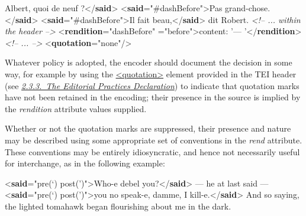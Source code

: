 \begin{shaded}
 Albert, quoi de neuf ?{</\textbf{said}>}\mbox{}\newline 
{<\textbf{said}\hspace*{1em}{rendition}="{\#dashBefore}">}Pas grand-chose.{</\textbf{said}>}\mbox{}\newline 
{<\textbf{said}\hspace*{1em}{rendition}="{\#dashBefore}">}Il fait beau,{</\textbf{said}>}\mbox{}\newline 
 dit Robert.\mbox{}\newline 
\mbox{}\newline 
\textit{<!-- ...  within the header  -->}\mbox{}\newline 
{<\textbf{rendition}\hspace*{1em}{xml:id}="{dashBefore}"\mbox{}\newline 
\hspace*{1em}{scope}="{before}">}content: '— '{</\textbf{rendition}>}\mbox{}\newline 
\textit{<!-- ... -->}\mbox{}\newline 
{<\textbf{quotation}\hspace*{1em}{marks}="{none}"/>}\end{shaded}\egroup\par \par
Whatever policy is adopted, the encoder should document the decision in some way, for example by using the \hyperref[TEI.quotation]{<quotation>} element provided in the TEI header (see \textit{\hyperref[HD53]{2.3.3.\ The Editorial Practices Declaration}}) to indicate that quotation marks have not been retained in the encoding; their presence in the source is implied by the {\itshape rendition} attribute values supplied.\par
Whether or not the quotation marks are suppressed, their presence and nature may be described using some appropriate set of conventions in the {\itshape rend} attribute. These conventions may be entirely idiosyncratic, and hence not necessarily useful for interchange, as in the following example: \par\bgroup{}\exampleFont \begin{shaded}\noindent\mbox{}{<\textbf{said}\hspace*{1em}{rend}="{pre(‘) post(’)}">}Who-e debel\mbox{}\newline 
 you?{</\textbf{said}>} — he at last said —\mbox{}\newline 
{<\textbf{said}\hspace*{1em}{rend}="{pre(‘) post(’)}">}you no speak-e,\mbox{}\newline 
 damme, I kill-e.{</\textbf{said}>} And so saying,\mbox{}\newline 
 the lighted tomahawk began flourishing\mbox{}\newline 
 about me in the dark.\end{shaded}\egroup\par \par

